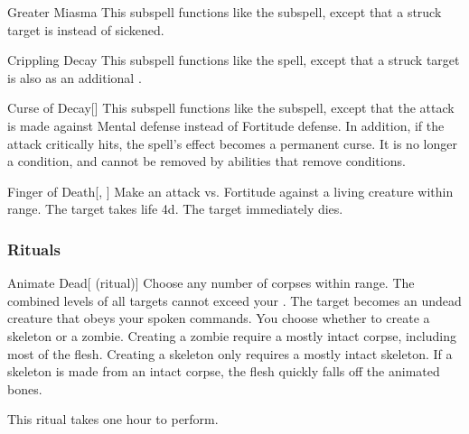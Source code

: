 \begin{ability}[\nth{3}]{Greater Miasma}
This subspell functions like the  subspell, except that a struck target is  instead of sickened.
\end{ability}
\vspace{0.25em}



\begin{ability}[\nth{4}]{Crippling Decay}
This subspell functions like the  spell, except that a struck target is also  as an additional .
\end{ability}
\vspace{0.25em}



\begin{ability}[\nth{4}]{Curse of Decay}[]
This subspell functions like the  subspell, except that the attack is made against Mental defense instead of Fortitude defense.
In addition, if the attack critically hits, the spell's effect becomes a permanent curse.
It is no longer a condition, and cannot be removed by abilities that remove conditions.
\end{ability}
\vspace{0.25em}



\begin{ability}[\nth{5}]{Finger of Death}[, ]
Make an attack vs. Fortitude against a living creature within \rngclose range.
\hit The target takes life  \plus4d.
\crit The target immediately dies.
\end{ability}
\vspace{0.25em}



\subsubsection{Rituals}


\begin{ability}[\nth{2}]{Animate Dead}[ (ritual)]
Choose any number of corpses within \rngclose range.
The combined levels of all targets cannot exceed your .
The target becomes an undead creature that obeys your spoken commands.
You choose whether to create a skeleton or a zombie.
Creating a zombie require a mostly intact corpse, including most of the flesh.
Creating a skeleton only requires a mostly intact skeleton.
If a skeleton is made from an intact corpse, the flesh quickly falls off the animated bones.

This ritual takes one hour to perform.
\end{ability}
\vspace{0.25em}


